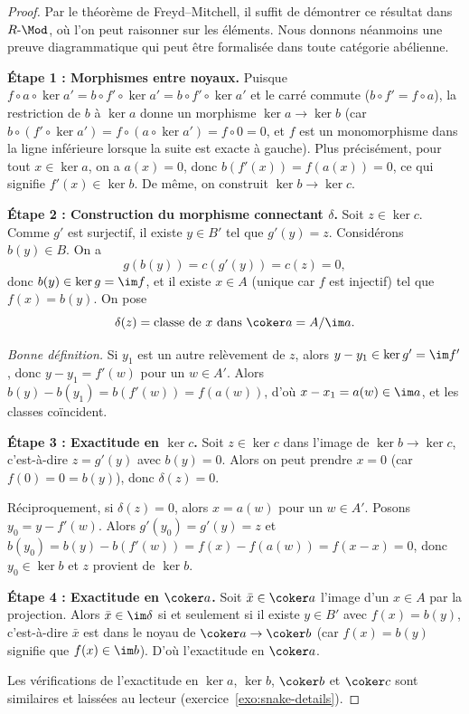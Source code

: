 \begin{proof}
Par le théorème de Freyd--Mitchell,
il suffit de démontrer ce résultat dans $R\text{-}\Mod$, où l'on peut
raisonner sur les éléments. Nous donnons néanmoins une preuve
diagrammatique qui peut être formalisée dans toute catégorie abélienne.

\medskip
\textbf{Étape 1 : Morphismes entre noyaux.}
Puisque $f \circ a \circ \ker a' = b \circ f' \circ \ker a' = b \circ f' \circ \ker a'$
et le carré commute ($b \circ f' = f \circ a$), la restriction de $b$ à
$\ker a$ donne un morphisme $\ker a \to \ker b$ (car
$b \circ (f' \circ \ker a') = f \circ (a \circ \ker a') = f \circ 0 = 0$,
et $f$ est un monomorphisme dans la ligne inférieure lorsque la suite est
exacte à gauche). Plus précisément, pour tout $x \in \ker a$, on a
$a(x) = 0$, donc $b(f'(x)) = f(a(x)) = 0$, ce qui signifie $f'(x) \in \ker b$.
De même, on construit $\ker b \to \ker c$.

\medskip
\textbf{Étape 2 : Construction du morphisme connectant $\delta$.}
Soit $z \in \ker c$. Comme $g'$ est surjectif, il existe $y \in B'$ tel que
$g'(y) = z$. Considérons $b(y) \in B$. On a
\[
  g(b(y)) = c(g'(y)) = c(z) = 0,
\]
donc $b(y) \in \ker g = \im f$, et il existe $x \in A$ (unique car $f$ est
injectif) tel que $f(x) = b(y)$. On pose
\[
  \delta(z) = \text{classe de } x \text{ dans } \coker a = A / \im a.
\]

\emph{Bonne définition.}
Si $y_1$ est un autre relèvement de $z$, alors $y - y_1 \in \ker g' = \im f'$,
donc $y - y_1 = f'(w)$ pour un $w \in A'$. Alors
$b(y) - b(y_1) = b(f'(w)) = f(a(w))$, d'où $x - x_1 = a(w) \in \im a$,
et les classes coïncident.

\medskip
\textbf{Étape 3 : Exactitude en $\ker c$.}
Soit $z \in \ker c$ dans l'image de $\ker b \to \ker c$, c'est-à-dire
$z = g'(y)$ avec $b(y) = 0$. Alors on peut prendre $x = 0$
(car $f(0) = 0 = b(y)$), donc $\delta(z) = 0$.

Réciproquement, si $\delta(z) = 0$, alors $x = a(w)$ pour un $w \in A'$.
Posons $y_0 = y - f'(w)$. Alors $g'(y_0) = g'(y) = z$ et
$b(y_0) = b(y) - b(f'(w)) = f(x) - f(a(w)) = f(x - x) = 0$,
donc $y_0 \in \ker b$ et $z$ provient de $\ker b$.

\medskip
\textbf{Étape 4 : Exactitude en $\coker a$.}
Soit $\bar{x} \in \coker a$ l'image d'un $x \in A$ par la projection.
Alors $\bar{x} \in \im \delta$ si et seulement si il existe $y \in B'$
avec $f(x) = b(y)$, c'est-à-dire $\bar{x}$ est dans le noyau de
$\coker a \to \coker b$ (car $f(x) = b(y)$ signifie que $f(x) \in \im b$).
D'où l'exactitude en $\coker a$.

Les vérifications de l'exactitude en $\ker a$, $\ker b$, $\coker b$ et
$\coker c$ sont similaires et laissées au lecteur (exercice~\ref{exo:snake-details}).
\end{proof}

